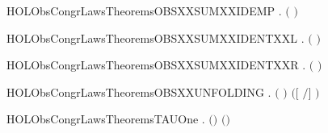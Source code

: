\newcommand{\HOLObsCongrLawsTheoremsOBSXXSUMXXCOMM}{\UseVerbatim{HOLObsCongrLawsTheoremsOBSXXSUMXXCOMM}}
\begin{SaveVerbatim}{HOLObsCongrLawsTheoremsOBSXXSUMXXIDEMP}
\HOLTokenTurnstile{} \HOLSymConst{\HOLTokenForall{}}.  \ensuremath{(} \HOLSymConst{\ensuremath{+}} \ensuremath{)} 
\end{SaveVerbatim}
\newcommand{\HOLObsCongrLawsTheoremsOBSXXSUMXXIDEMP}{\UseVerbatim{HOLObsCongrLawsTheoremsOBSXXSUMXXIDEMP}}
\begin{SaveVerbatim}{HOLObsCongrLawsTheoremsOBSXXSUMXXIDENTXXL}
\HOLTokenTurnstile{} \HOLSymConst{\HOLTokenForall{}}.  \ensuremath{(} \HOLSymConst{\ensuremath{+}} \ensuremath{)} 
\end{SaveVerbatim}
\newcommand{\HOLObsCongrLawsTheoremsOBSXXSUMXXIDENTXXL}{\UseVerbatim{HOLObsCongrLawsTheoremsOBSXXSUMXXIDENTXXL}}
\begin{SaveVerbatim}{HOLObsCongrLawsTheoremsOBSXXSUMXXIDENTXXR}
\HOLTokenTurnstile{} \HOLSymConst{\HOLTokenForall{}}.  \ensuremath{(} \HOLSymConst{\ensuremath{+}} \ensuremath{)} 
\end{SaveVerbatim}
\newcommand{\HOLObsCongrLawsTheoremsOBSXXSUMXXIDENTXXR}{\UseVerbatim{HOLObsCongrLawsTheoremsOBSXXSUMXXIDENTXXR}}
\begin{SaveVerbatim}{HOLObsCongrLawsTheoremsOBSXXUNFOLDING}
\HOLTokenTurnstile{} \HOLSymConst{\HOLTokenForall{}} .  \ensuremath{(}  \ensuremath{)} \ensuremath{(}\ensuremath{[}  \ensuremath{/}\ensuremath{]} \ensuremath{)}
\end{SaveVerbatim}
\newcommand{\HOLObsCongrLawsTheoremsOBSXXUNFOLDING}{\UseVerbatim{HOLObsCongrLawsTheoremsOBSXXUNFOLDING}}
\begin{SaveVerbatim}{HOLObsCongrLawsTheoremsTAUOne}
\HOLTokenTurnstile{} \HOLSymConst{\HOLTokenForall{}} .  \ensuremath{(}\HOLSymConst{\ensuremath{\ldotp}}\HOLConst{\ensuremath{\tau}}\HOLSymConst{\ensuremath{\ldotp}}\ensuremath{)} \ensuremath{(}\HOLSymConst{\ensuremath{\ldotp}}\ensuremath{)}
\end{SaveVerbatim}
